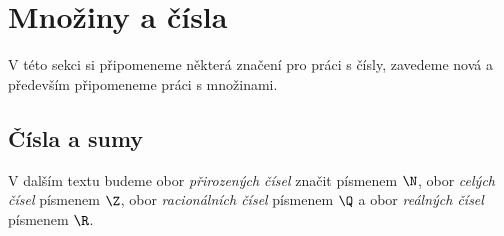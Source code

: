 \section{Množiny a čísla}\label{sec:mnoziny_a_cisla}

V této sekci si připomeneme některá značení pro práci s čísly, zavedeme nová a především připomeneme práci s množinami.

\subsection{Čísla a sumy}

\begin{convention}
    V dalším textu budeme obor \emph{přirozených čísel} značit písmenem $\N$, obor \emph{celých čísel} písmenem $\Z$, obor \emph{racionálních čísel} písmenem $\Q$ a obor \emph{reálných čísel} písmenem $\R$.
\end{convention}

